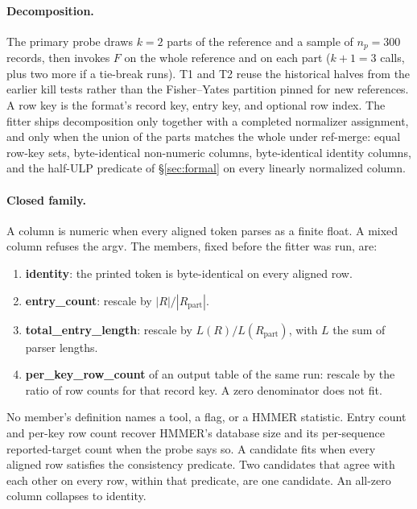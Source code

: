 \documentclass[letterpaper,twocolumn,10pt]{article}
\begin{document}
\paragraph{Decomposition.}
The primary probe draws
$k = 2$
parts of the reference and a sample of
$n_p = 300$
records, then invokes $F$ on the whole reference and on each part
($k+1 = 3$
calls, plus two more if a tie-break runs).
T1 and T2 reuse the historical halves from the earlier kill tests rather than the Fisher--Yates partition pinned for new references.
A row key is the format's record key, entry key, and optional row index.
The fitter ships decomposition only together with a completed normalizer assignment, and only when the union of the parts matches the whole under ref-merge: equal row-key sets, byte-identical non-numeric columns, byte-identical identity columns, and the half-ULP predicate of \S\ref{sec:formal} on every linearly normalized column.

\paragraph{Closed family.}
A column is numeric when every aligned token parses as a finite float.
A mixed column refuses the argv.
The members, fixed before the fitter was run, are:
\begin{enumerate}
  \item \textbf{identity}: the printed token is byte-identical on every aligned row.
  \item \textbf{entry\_count}: rescale by $|R| / |R_{\mathrm{part}}|$.
  \item \textbf{total\_entry\_length}: rescale by $L(R) / L(R_{\mathrm{part}})$, with $L$ the sum of parser lengths.
  \item \textbf{per\_key\_row\_count} of an output table of the same run: rescale by the ratio of row counts for that record key.
  A zero denominator does not fit.
\end{enumerate}
No member's definition names a tool, a flag, or a HMMER statistic.
Entry count and per-key row count recover HMMER's database size and its per-sequence reported-target count when the probe says so.
A candidate fits when every aligned row satisfies the consistency predicate.
Two candidates that agree with each other on every row, within that predicate, are one candidate.
An all-zero column collapses to identity.
\end{document}
